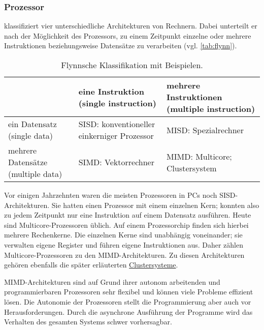       \subsubsection{Prozessor}
      \label{sec:processor}
      \citet{flynn} klassifiziert vier unterschiedliche Architekturen von Rechnern. Dabei unterteilt er nach der Möglichkeit des Prozessors, zu einem Zeitpunkt einzelne oder mehrere
      Instruktionen beziehungsweise Datensätze zu verarbeiten (vgl. \autoref{tab:flynn}).
      \begin{table}[tb]
	\centering
	\begin{tabular}{|p{3.5cm}|p{4cm}|p{4cm}|}
	  \hline
			                             & eine Instruktion \newline (single instruction)       & mehrere Instruktionen \newline (multiple instruction) \\
	  \hline
	  ein Datensatz \newline (single data)       & SISD: konventioneller \newline einkerniger Prozessor & MISD: Spezialrechner                                  \\
	  \hline
	  mehrere Datensätze \newline (multiple data)& SIMD: Vektorrechner                                  & MIMD: Multicore; \newline Clustersystem               \\
	  \hline
	\end{tabular}
	\caption{Flynnsche Klassifikation mit Beispielen.}
	\label{tab:flynn}
      \end{table}
      
      Vor einigen Jahrzehnten waren die meisten Prozessoren in PCs noch SISD-Architekturen. Sie hatten einen Prozessor mit einem einzelnen Kern; konnten also zu jedem Zeitpunkt nur eine Instruktion
      auf einem Datensatz ausführen. Heute sind Multicore-Prozessoren üblich. Auf einem Prozessorchip finden sich hierbei mehrere Rechenkerne. Die einzelnen Kerne sind unabhängig voneinander; sie 
      verwalten eigene Register und führen eigene Instruktionen aus. Daher zählen Multicore-Prozessoren zu den MIMD-Architekturen. Zu diesen Architekturen gehören ebenfalls die später erläuterten 
      \hyperref[sec:netzwerk]{Clustersysteme}. \citep{flynn, multicore}
      
      MIMD-Architekturen sind auf Grund ihrer autonom arbeitenden und programmierbaren Prozessoren sehr flexibel und können viele Probleme effizient lösen. Die Autonomie der Prozessoren
      stellt die Programmierung aber auch vor Herausforderungen. Durch die asynchrone Ausführung der Programme wird das Verhalten des gesamten Systems schwer vorhersagbar. \citep{hpcskript}
      
